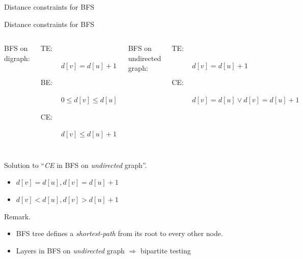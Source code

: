 \begin{frame}{Distance constraints for BFS}
  \begin{exampleblock}{Distance constraints for BFS }
    \begin{columns}[t]
        BFS on digraph:
	\begin{description}
	  \item[TE:] $d[v] = d[u] + 1$
	  \item[BE:] $0 \le d[v] \le d[u]$
	  \item[CE:] $d[v] \le d[u] + 1$
	\end{description}
        BFS on undirected graph:
	\begin{description}
	  \item[TE:] $d[v] = d[u] + 1$
	  \item[CE:] $d[v] = d[u] \lor d[v] = d[u] + 1$ 
	\end{description}
    \end{columns}
  \end{exampleblock}

  \begin{block}{Solution to ``\emph{CE} in BFS on \emph{undirected} graph''.}
    \begin{itemize}
      \item $d[v] = d[u], d[v] = d[u] + 1$
      \item $d[v] < d[u], d[v] > d[u] + 1$
    \end{itemize}
  \end{block}

  \begin{alertblock}{Remark.}
    \begin{itemize}
      \item BFS tree defines a \emph{shortest-path} from its root to every other node.
      \item Layers in BFS on \emph{undirected} graph $\Rightarrow$ bipartite testing 
    \end{itemize}
  \end{alertblock}
\end{frame}
